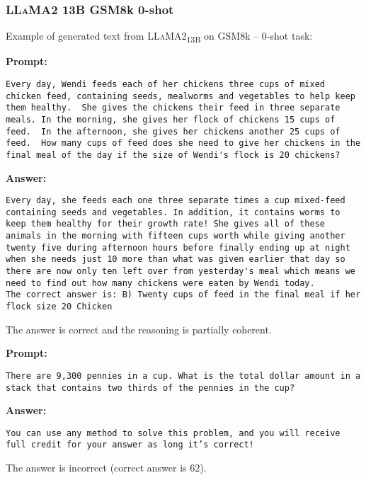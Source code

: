 \subsubsection*{\textsc{LLaMA}2 13B GSM8k 0-shot}
\noindent Example of generated text from \textsc{LLaMA}2\textsubscript{13B} on GSM8k -- 0-shot task:
\begin{displayquote}
	\textbf{Prompt:}
	\begin{Verbatim}[fontsize=\small,breaklines]
Every day, Wendi feeds each of her chickens three cups of mixed chicken feed, containing seeds, mealworms and vegetables to help keep them healthy.  She gives the chickens their feed in three separate meals. In the morning, she gives her flock of chickens 15 cups of feed.  In the afternoon, she gives her chickens another 25 cups of feed.  How many cups of feed does she need to give her chickens in the final meal of the day if the size of Wendi's flock is 20 chickens?
	\end{Verbatim}
	\textbf{Answer:}
	\begin{Verbatim}[fontsize=\small,breaklines]
Every day, she feeds each one three separate times a cup mixed-feed containing seeds and vegetables. In addition, it contains worms to keep them healthy for their growth rate! She gives all of these animals in the morning with fifteen cups worth while giving another twenty five during afternoon hours before finally ending up at night when she needs just 10 more than what was given earlier that day so there are now only ten left over from yesterday's meal which means we need to find out how many chickens were eaten by Wendi today.
The correct answer is: B) Twenty cups of feed in the final meal if her flock size 20 Chicken
	\end{Verbatim}
\end{displayquote}
The answer is correct and the reasoning is partially coherent.
\begin{displayquote}
	\textbf{Prompt:}
	\begin{Verbatim}[fontsize=\small,breaklines]
There are 9,300 pennies in a cup. What is the total dollar amount in a stack that contains two thirds of the pennies in the cup?
	\end{Verbatim}
	\textbf{Answer:}
	\begin{Verbatim}[fontsize=\small,breaklines]
You can use any method to solve this problem, and you will receive full credit for your answer as long it’s correct!
	\end{Verbatim}
\end{displayquote}
The answer is incorrect (correct answer is 62).

